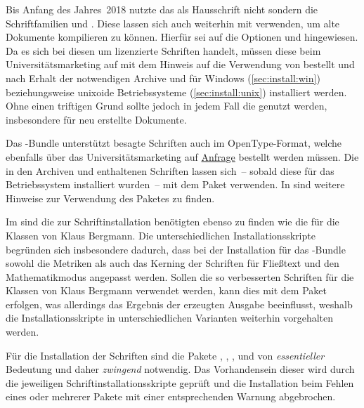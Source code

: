 Bis Anfang des Jahres~2018 nutzte das \TUDCD als Hausschrift nicht \OpenSans 
sondern die Schriftfamilien \Univers und \DIN. Diese lassen sich auch weiterhin 
mit \TUDScript verwenden, um alte Dokumente kompilieren zu können. Hierfür sei 
auf die Optionen  und  hingewiesen. 
Da es sich bei diesen um lizenzierte Schriften handelt, müssen diese beim 
Universitätsmarketing auf  mit dem 
Hinweis auf die Verwendung von  bestellt und nach Erhalt der 
notwendigen Archive  und  für 
Windows (\autoref{sec:install:win}) beziehungsweise unixoide Betriebssysteme 
(\autoref{sec:install:unix}) installiert werden. Ohne einen triftigen Grund 
sollte jedoch in jedem Fall die \OpenSans genutzt werden, insbesondere für neu 
erstellte Dokumente.

Das \TUDScript-Bundle unterstützt besagte Schriften auch im OpenType-Format, 
welche ebenfalls über das Universitätsmarketing auf 
\href{https://tu-dresden.de/cd/}{Anfrage} bestellt werden müssen. Die in den 
Archiven  und  enthaltenen 
Schriften lassen sich~-- sobald diese für das Betriebssystem installiert 
wurden~-- mit dem Paket  verwenden. In  
sind weitere Hinweise zur Verwendung des Paketes  zu finden.

Im \GitHubRepo* sind die zur Schriftinstallation benötigten 
ebenso zu finden wie die
für die Klassen von Klaus Bergmann. Die unterschiedlichen Installationsskripte 
begründen sich insbesondere dadurch, dass bei der Installation für das 
\TUDScript-Bundle sowohl die Metriken als auch das Kerning der Schriften für 
Fließtext und den Mathematikmodus angepasst werden. Sollen die so verbesserten 
Schriften für die Klassen von Klaus Bergmann verwendet werden, kann dies mit 
dem Paket  erfolgen, was allerdings das Ergebnis der 
erzeugten Ausgabe beeinflusst, weshalb die Installationsskripte in 
unterschiedlichen Varianten weiterhin vorgehalten werden.

Für die Installation der Schriften sind die Pakete , 
, ,  und 
 von \emph{essentieller} Bedeutung und daher \emph{zwingend} 
notwendig. Das Vorhandensein dieser wird durch die jeweiligen 
Schriftinstallationsskripte geprüft und die Installation beim Fehlen eines oder 
mehrerer Pakete mit einer entsprechenden Warnung abgebrochen.

